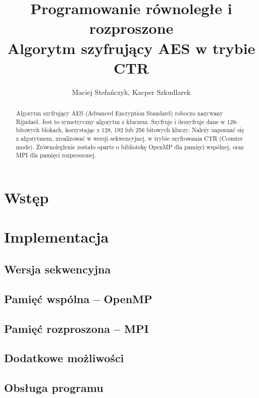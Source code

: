 \documentclass[a4paper,12pt]{article}
\begin{document}
\title{{\small Programowanie równoległe i rozproszone}\\Algorytm szyfrujący AES w trybie CTR}
\author{Maciej Stefańczyk, Kacper Szkudlarek}

\maketitle

\begin{abstract}
Algorytm szyfrujący AES (Advanced Encryption Standard) roboczo nazywany
Rijndael. Jest to symetryczny algorytm z kluczem. Szyfruje i deszyfruje dane w 128-
bitowych blokach, korzystając z 128, 192 lub 256 bitowych kluczy. Należy zapoznać się
z algorytmem, zrealizować w wersji sekwencyjnej, w trybie szyfrowania CTR (Counter
mode). Zrównoleglenie zostało oparte o bibliotekę OpenMP dla pamięci wspólnej, oraz
MPI dla pamięci rozproszonej.
\end{abstract}


\section{Wstęp}

\section{Implementacja}

\subsection{Wersja sekwencyjna}

\subsection{Pamięć wspólna -- OpenMP}

\subsection{Pamięć rozproszona -- MPI}

\subsection{Dodatkowe możliwości}

\subsection{Obsługa programu}
\end{document}
